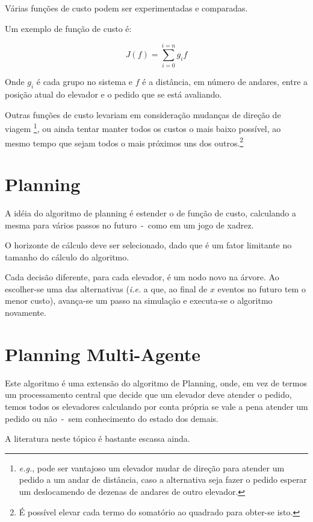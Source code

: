 Várias funções de custo podem ser experimentadas e comparadas.

Um exemplo de função de custo é:

\[
  J(f) = \sum_{i=0}^{i=n} g_{i}f
\]

Onde $g_{i}$ é cada grupo no sistema e $f$ é a distância, em número de andares,
entre a posição atual do elevador e o pedido que se está avaliando.

Outras funções de custo levariam em consideração mudanças de direção de viagem
\footnote{\textit{e.g.}, pode ser vantajoso um elevador mudar de direção para atender um
pedido a um andar de distância, caso a alternativa seja fazer o pedido esperar
um deslocamendo de dezenas de andares de outro elevador.}, ou ainda tentar
manter todos os custos o mais baixo possível, ao mesmo tempo que sejam todos o
mais próximos uns dos outros.\footnote{É possível elevar cada termo do somatório ao
  quadrado para obter-se isto.}

\section{Planning}


A idéia do algoritmo de planning é estender o de função de custo, calculando a
mesma para vários passos no futuro~-~como em um jogo de xadrez.

O horizonte de cálculo deve ser selecionado, dado que é um fator limitante no
tamanho do cálculo do algoritmo.

Cada decisão diferente, para cada elevador, é um nodo novo na árvore. Ao
escolher-se uma das alternativas (\textit{i.e.} a que, ao final de $x$ eventos
no futuro tem o menor custo), avança-se um passo na simulação e executa-se o
algoritmo novamente.

\section{Planning Multi-Agente}

Este algoritmo é uma extensão do algoritmo de Planning, onde, em vez de termos
um processamento central que decide que um elevador deve atender o pedido, temos
todos os elevadores calculando por conta própria se vale a pena atender um
pedido ou não~-~sem conhecimento do estado dos demais.

A literatura neste tópico é bastante escassa ainda.